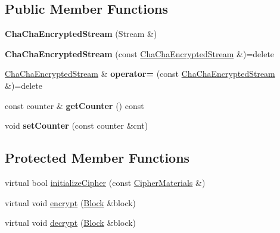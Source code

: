 \subsection*{Public Member Functions}
\begin{DoxyCompactItemize}
\item 
\mbox{\label{classathome_1_1arduino_1_1_cha_cha_encrypted_stream_a1660816544b83e097d6bd917036e2cfb}} 
{\bfseries Cha\+Cha\+Encrypted\+Stream} (Stream \&)
\item 
\mbox{\label{classathome_1_1arduino_1_1_cha_cha_encrypted_stream_ac5cec464c3443f42e769987286254876}} 
{\bfseries Cha\+Cha\+Encrypted\+Stream} (const \mbox{\hyperlink{classathome_1_1arduino_1_1_cha_cha_encrypted_stream}{Cha\+Cha\+Encrypted\+Stream}} \&)=delete
\item 
\mbox{\label{classathome_1_1arduino_1_1_cha_cha_encrypted_stream_a8024bdb4d917438e458be8a96c4fce8c}} 
\mbox{\hyperlink{classathome_1_1arduino_1_1_cha_cha_encrypted_stream}{Cha\+Cha\+Encrypted\+Stream}} \& {\bfseries operator=} (const \mbox{\hyperlink{classathome_1_1arduino_1_1_cha_cha_encrypted_stream}{Cha\+Cha\+Encrypted\+Stream}} \&)=delete
\item 
\mbox{\label{classathome_1_1arduino_1_1_cha_cha_encrypted_stream_a919035578857f47afc97729308aa8b77}} 
const counter \& {\bfseries get\+Counter} () const
\item 
\mbox{\label{classathome_1_1arduino_1_1_cha_cha_encrypted_stream_a85fc5796dc8697fae3153ac3c3ae59e8}} 
void {\bfseries set\+Counter} (const counter \&cnt)
\end{DoxyCompactItemize}
\subsection*{Protected Member Functions}
\begin{DoxyCompactItemize}
\item 
virtual bool \mbox{\hyperlink{classathome_1_1arduino_1_1_cha_cha_encrypted_stream_adc55767997450f10d99a6e907a9c95ff}{initialize\+Cipher}} (const \mbox{\hyperlink{classathome_1_1arduino_1_1_a_encrypted_stream_a67d68ce9b0daa19296b38c9bb3a5aee7}{Cipher\+Materials}} \&)
\item 
virtual void \mbox{\hyperlink{classathome_1_1arduino_1_1_cha_cha_encrypted_stream_a34c2613f9f8100c1064f6b6b97a5b0f9}{encrypt}} (\mbox{\hyperlink{structathome_1_1arduino_1_1_a_encrypted_stream_1_1_block}{Block}} \&block)
\item 
virtual void \mbox{\hyperlink{classathome_1_1arduino_1_1_cha_cha_encrypted_stream_ae0cd8d9dd46060a08789f0c1b221a400}{decrypt}} (\mbox{\hyperlink{structathome_1_1arduino_1_1_a_encrypted_stream_1_1_block}{Block}} \&block)
\end{DoxyCompactItemize}
